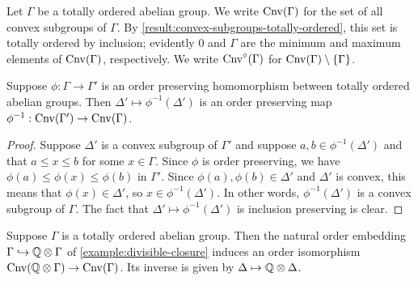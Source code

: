 \begin{definition}
\label{definition:set-of-convex}
Let $\Gamma$ be a totally ordered abelian group. We write $\operatorname{Cnv}(\Gamma)$ for the set of all convex subgroups of $\Gamma$. By \cref{result:convex-subgroups-totally-ordered}, this set is totally ordered by inclusion; evidently $0$ and $\Gamma$ are the minimum and maximum elements of $\operatorname{Cnv}(\Gamma)$, respectively. We write $\operatorname{Cnv}^\circ(\Gamma)$ for $\operatorname{Cnv}(\Gamma) \setminus \{\Gamma\}$. 
\end{definition}

\begin{lemma}
\label{result:pullback-convex-subgroups}
Suppose $\phi : \Gamma \to \Gamma'$ is an order preserving homomorphism between totally ordered abelian groups. Then $\Delta' \mapsto \phi^{-1}(\Delta')$ is an order preserving map $\phi^{-1} : \operatorname{Cnv}(\Gamma') \to \operatorname{Cnv}(\Gamma)$.
\end{lemma}

\begin{proof}
Suppose $\Delta'$ is a convex subgroup of $\Gamma'$ and suppose $a, b \in \phi^{-1}(\Delta')$ and that $a \leq x \leq b$ for some $x \in \Gamma$. Since $\phi$ is order preserving, we have $\phi(a) \leq \phi(x) \leq \phi(b)$ in $\Gamma'$. Since $\phi(a), \phi(b) \in \Delta'$ and $\Delta'$ is convex, this means that $\phi(x) \in \Delta'$, so $x \in \phi^{-1}(\Delta')$. In other words, $\phi^{-1}(\Delta')$ is a convex subgroup of $\Gamma$. The fact that $\Delta' \mapsto \phi^{-1}(\Delta')$ is inclusion preserving is clear. 
\end{proof}

\begin{lemma}
\label{result:convex-subgroups-divisible-closure}
Suppose $\Gamma$ is a totally ordered abelian group. Then the natural order embedding $\Gamma \hookrightarrow \mathbb{Q} \otimes \Gamma$ of \cref{example:divisible-closure} induces an order isomorphism $\operatorname{Cnv}(\mathbb{Q} \otimes \Gamma) \to \operatorname{Cnv}(\Gamma)$. Its inverse is given by $\Delta \mapsto \mathbb{Q} \otimes \Delta$. 
\end{lemma}

